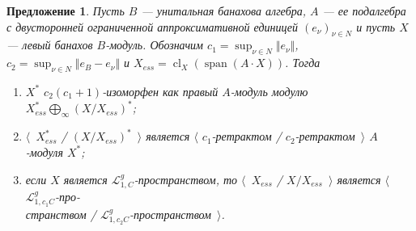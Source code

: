 \documentclass[12pt]{article}
\newtheorem{proposition}[theorem]{Предложение}
\begin{document}
\begin{proposition}\label{DualBanModDecomp} Пусть $B$ --- унитальная банахова
алгебра, $A$ --- ее подалгебра с двусторонней ограниченной аппроксимативной
единицей ${(e_\nu)}_{\nu\in N}$ и пусть $X$ --- левый банахов $B$-модуль.
Обозначим $c_1=\sup_{\nu\in N}\Vert e_\nu\Vert$, $c_2=\sup_{\nu\in N}\Vert
e_B-e_\nu\Vert$ и $X_{ess}=\operatorname{cl}_X(\operatorname{span}(A\cdot X))$.
Тогда 
\begin{enumerate}[label = (\roman*)]
\item $X^*$ $c_2(c_1+1)$-изоморфен как правый $A$-модуль модулю
$X_{ess}^*\bigoplus_\infty {(X/X_{ess})}^*$;
\item $\langle$~$X_{ess}^*$ / ${(X/X_{ess})}^*$~$\rangle$ является $\langle$
$c_1$-ретрактом / $c_2$-ретрактом~$\rangle$ $A$-модуля $X^*$;
\item если $X$ является $\mathcal{L}_{1,C}^g$-пространством, то
$\langle$~$X_{ess}$ / $X/X_{ess}$~$\rangle$ является
$\langle$~$\mathcal{L}_{1,c_1C}^g$-про-\\странством /
$\mathcal{L}_{1,c_2C}^g$-пространством~$\rangle$.
\end{enumerate}
\end{proposition}
\end{document}
